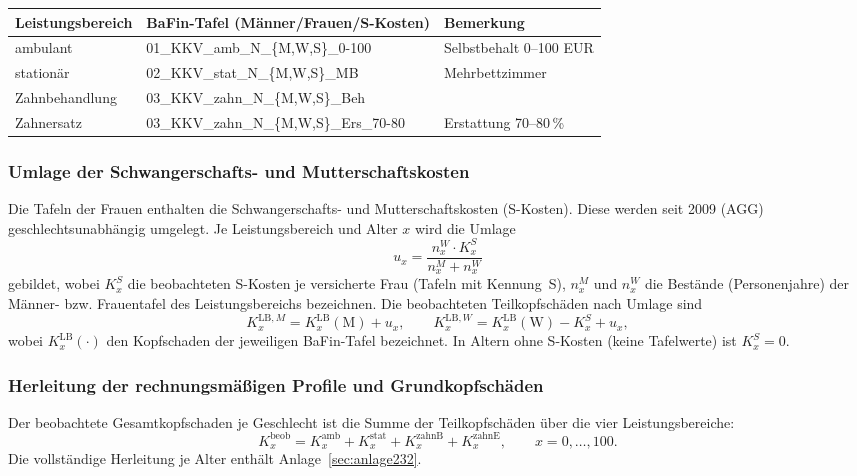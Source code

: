 \begin{center}\small
\begin{tabular}{@{}lll@{}}
\toprule
Leistungsbereich & BaFin-Tafel (Männer/Frauen/S-Kosten) & Bemerkung \\
\midrule
ambulant & 01\_KKV\_amb\_N\_\{M,W,S\}\_0-100 & Selbstbehalt 0--100 EUR \\
stationär & 02\_KKV\_stat\_N\_\{M,W,S\}\_MB & Mehrbettzimmer \\
Zahnbehandlung & 03\_KKV\_zahn\_N\_\{M,W,S\}\_Beh & \\
Zahnersatz & 03\_KKV\_zahn\_N\_\{M,W,S\}\_Ers\_70-80 & Erstattung 70--80\,\% \\
\bottomrule
\end{tabular}
\end{center}

\subsubsection{Umlage der Schwangerschafts- und Mutterschaftskosten}
\label{sec:sumlage}

Die Tafeln der Frauen enthalten die Schwangerschafts- und
Mutterschaftskosten (S-Kosten). Diese werden seit 2009 (AGG)
geschlechtsunabhängig umgelegt. Je Leistungsbereich und Alter $x$ wird
die Umlage
\begin{equation}
u_x = \frac{n^{W}_x \cdot K^{S}_x}{n^{M}_x + n^{W}_x}
\label{eq:sumlage}
\end{equation}
gebildet, wobei $K^{S}_x$ die beobachteten S-Kosten je versicherte Frau
(Tafeln mit Kennung~S), $n^{M}_x$ und $n^{W}_x$ die Bestände
(Personenjahre) der Männer- bzw. Frauentafel des Leistungsbereichs
bezeichnen. Die beobachteten Teilkopfschäden nach Umlage sind
\begin{equation}
K^{\mathrm{LB},M}_x = K^{\mathrm{LB}}_x(\text{M}) + u_x,
\qquad
K^{\mathrm{LB},W}_x = K^{\mathrm{LB}}_x(\text{W}) - K^{S}_x + u_x,
\label{eq:teilkopf}
\end{equation}
wobei $K^{\mathrm{LB}}_x(\cdot)$ den Kopfschaden der jeweiligen
BaFin-Tafel bezeichnet. In Altern ohne S-Kosten (keine
Tafelwerte) ist $K^S_x = 0$.

\subsubsection{Herleitung der rechnungsmäßigen Profile und
Grundkopfschäden}\label{sec:kopfschaden-herleitung}

Der beobachtete Gesamtkopfschaden je Geschlecht ist die Summe der
Teilkopfschäden über die vier Leistungsbereiche:
\begin{equation}
K^{\mathrm{beob}}_x
= K^{\mathrm{amb}}_x + K^{\mathrm{stat}}_x + K^{\mathrm{zahnB}}_x
+ K^{\mathrm{zahnE}}_x ,
\qquad x = 0,\dots,100.
\label{eq:ksumme}
\end{equation}
Die vollständige Herleitung je Alter enthält Anlage~\ref{sec:anlage232}.

